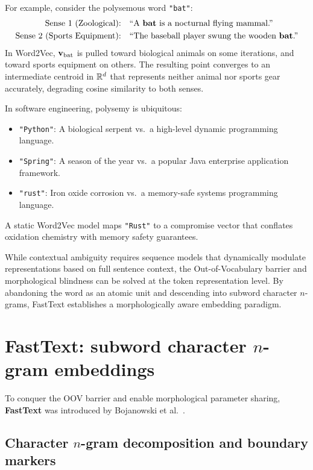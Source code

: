 \documentclass[../../main.tex]{subfiles}
\begin{document}
For example, consider the polysemous word \texttt{"bat"}:
\begin{align*}
\text{Sense 1 (Zoological):} \quad &\text{``A \textbf{bat} is a nocturnal flying mammal.''} \\
\text{Sense 2 (Sports Equipment):} \quad &\text{``The baseball player swung the wooden \textbf{bat}.''}
\end{align*}
In Word2Vec, $\mathbf{v}_{\text{bat}}$ is pulled toward biological animals on some iterations, and toward sports equipment on others. The resulting point converges to an intermediate centroid in $\mathbb{R}^d$ that represents neither animal nor sports gear accurately, degrading cosine similarity to both senses.

In software engineering, polysemy is ubiquitous:
\begin{itemize}
    \item \texttt{"Python"}: A biological serpent vs.~a high-level dynamic programming language.
    \item \texttt{"Spring"}: A season of the year vs.~a popular Java enterprise application framework.
    \item \texttt{"rust"}: Iron oxide corrosion vs.~a memory-safe systems programming language.
\end{itemize}
A static Word2Vec model maps \texttt{"Rust"} to a compromise vector that conflates oxidation chemistry with memory safety guarantees.

While contextual ambiguity requires sequence models that dynamically modulate representations based on full sentence context, the Out-of-Vocabulary barrier and morphological blindness can be solved at the token representation level. By abandoning the word as an atomic unit and descending into subword character $n$-grams, FastText establishes a morphologically aware embedding paradigm.

\clearpage
\section{FastText: subword character \texorpdfstring{$n$}{n}-gram embeddings}
\label{sec:fasttext_subwords}

To conquer the OOV barrier and enable morphological parameter sharing, \textbf{FastText} was introduced by Bojanowski et al.~\cite{bojanowski2017}.

\subsection{Character \texorpdfstring{$n$}{n}-gram decomposition and boundary markers}
\label{subsec:character_ngrams}
\end{document}
